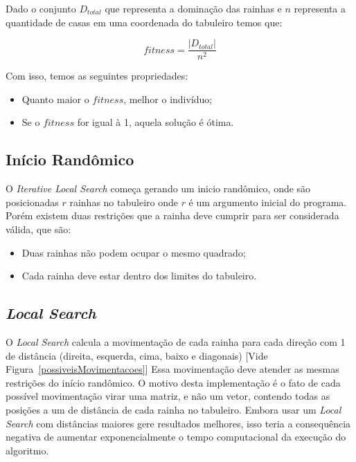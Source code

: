 \documentclass[
	article,			%
	11pt,				%
	oneside,			%
	a4paper,			%
	english,			%
	brazil,				%
	sumario=tradicional
	]{abntex2}
\begin{document}
Dado o conjunto $D{_{total}}$ que representa a dominação das rainhas e $n$ representa a quantidade de casas em uma coordenada do tabuleiro temos que:

\begin{equation}
 fitness = \frac{\left | D{_{total}} \right |}{n^{2}}
\end{equation}

Com isso, temos as seguintes propriedades:
\begin{itemize}

  \item Quanto maior o $fitness$, melhor o indivíduo;
  
  \item Se o $fitness$ for igual à 1, aquela solução é ótima.
  
\end{itemize}

\subsection{Início Randômico}

O \textit{Iterative Local Search} começa gerando um inicio randômico, onde são posicionadas $r$ rainhas no tabuleiro onde $r$ é um argumento inicial do programa. Porém existem duas restrições que a rainha deve cumprir para ser considerada válida, que são: 
\begin{itemize}

  \item Duas rainhas não podem ocupar o mesmo quadrado;
 
  \item Cada rainha deve estar dentro dos limites do tabuleiro.

\end{itemize}

\subsection{\textit{Local Search}}
O \textit{Local Search} calcula a movimentação de cada rainha para cada direção com 1 de distância (direita, esquerda, cima, baixo e diagonais) [Vide Figura~\ref{possiveisMovimentacoes}] Essa movimentação deve atender as mesmas restrições do início randômico. O motivo desta implementação é o fato de cada possível movimentação virar uma matriz, e não um vetor, contendo todas as posições a um de distância de cada rainha no tabuleiro. Embora usar um \textit{Local Search} com distâncias maiores gere resultados melhores, isso teria a consequência negativa de aumentar exponencialmente o tempo computacional da execução do algoritmo.
\end{document}
